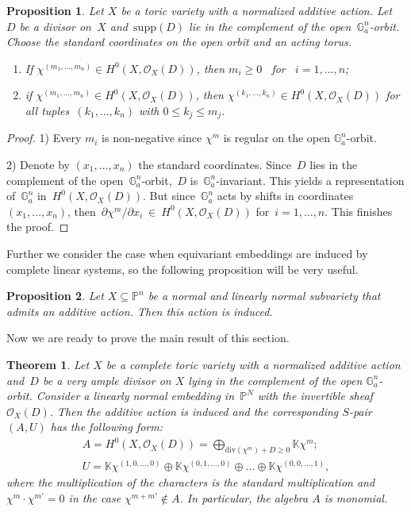 \documentclass[a4paper,draft,reqno,12pt]{amsart}
\newtheorem{proposition}{Proposition}
\newtheorem{theorem}{Theorem}
\theoremstyle{definition}
\theoremstyle{definition}
\theoremstyle{remark}
\DeclareMathOperator{\supp}{Supp}
\def\BG{{\mathbb G}}
\def\BK{{\mathbb K}}
\def\BG{{\mathbb G}}
\def\BK{{\mathbb K}}
\def\BP{{\mathbb P}}
\def\CO{\mathcal{O}}
\def\div{\mathrm{div}}
\def\supp{\mathrm{supp}}
\begin{document}
\begin{proposition}\label{toricsections}
    Let $X$ be a toric variety with a normalized additive action. Let~$D$ be a divisor on~$X$ and~$\supp(D)$ lie in the complement of the open~$\BG_a^n$-orbit. Choose the standard coordinates on the open orbit and an acting torus. \begin{enumerate}
        \item[1)] If $\chi^{(m_1,\dotsc,m_n)}\in H^0(X, \CO_X(D))$, then $m_i \geq 0$ \ for \ $i=1,\dotsc,n$;
        \item[2)]if $\chi^{(m_1,\dotsc,m_n)}\in H^0(X, \CO_X(D))$, then $\chi^{(k_1,\dotsc,k_n)} \in H^0(X, \CO_X(D))$ for all tuples~$(k_1,\dotsc,k_n)$ with $0\leq k_j\leq m_j$.
    \end{enumerate}
\end{proposition}

\begin{proof}
    1) Every $m_i$ is non-negative since $\chi^m$ is regular on the open $\BG_a^n$-orbit.
    
    2) Denote by $(x_1,\dotsc,x_n)$ the standard coordinates. Since~$D$ lies in the complement of the open~$\BG_a^n$-orbit,~$D$ is~$\BG_a^n$-invariant. This yields a representation of~$\BG_a^n$ in~$H^0(X,\CO_X(D))$. But since~$\BG_a^n$ acts by shifts in coordinates~$(x_1,\dotsc,x_n)$, then~$\partial\chi^m/\partial x_i~\in~H^0(X,\CO_X(D))$ for~$i=1,\dotsc,n$. This finishes the proof.
\end{proof}

Further we consider the case when equivariant embeddings are induced by complete linear systems, so the following proposition will be very useful.

\begin{proposition}\cite[Section 2]{AP}\label{linnormind}
    Let $X\subseteq\BP^n$ be a normal and linearly normal subvariety that admits an additive action. Then this action is induced.
\end{proposition}

Now we are ready to prove the main result of this section. 

\begin{theorem}\label{algebranorm}
    Let $X$ be a complete toric variety with a normalized additive action and~$D$ be a very ample divisor on $X$ lying in the complement of the open $\BG_a^n$-orbit. Consider a linearly normal embedding in~$\BP^N$ with the invertible sheaf~$\CO_X(D)$. Then the additive action is induced and the corresponding $S$-pair~$(A,U)$ has the following form:\begin{gather}
        A =  H^0(X, \CO_X(D)) = \bigoplus_{\div(\chi^m)+D\geq0}\BK\chi^m; \\
        U = \BK\chi^{(1,0,\dotsc,0)}\oplus\BK\chi^{(0,1,\dotsc,0)}\oplus\dotsc\oplus\BK\chi^{(0,0,\dotsc,1)},
    \end{gather} where the multiplication of the characters is the standard multiplication and $\chi^m\cdot\chi^{m'} = 0$ in the case $\chi^{m+m'} \notin A$. In particular, the algebra $A$ is monomial.
\end{theorem}
\end{document}
